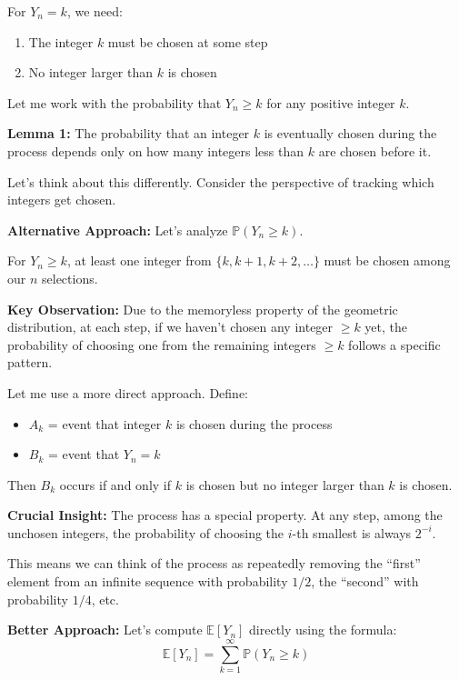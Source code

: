 \documentclass[12pt,a4paper]{article}
\theoremstyle{definition}
\begin{document}
    For $Y_n = k$, we need:
    \begin{enumerate}
        \item The integer $k$ must be chosen at some step
        \item No integer larger than $k$ is chosen
    \end{enumerate}

    Let me work with the probability that $Y_n \geq k$ for any positive integer $k$.

    \textbf{Lemma 1:} The probability that an integer $k$ is eventually chosen during the process depends only on how many integers less than $k$ are chosen before it.

    Let's think about this differently. Consider the perspective of tracking which integers get chosen.

    \textbf{Alternative Approach:} Let's analyze $\mathbb{P}(Y_n \geq k)$.

    For $Y_n \geq k$, at least one integer from $\{k, k+1, k+2, \ldots\}$ must be chosen among our $n$ selections.

    \textbf{Key Observation:} Due to the memoryless property of the geometric distribution, at each step, if we haven't chosen any integer $\geq k$ yet, the probability of choosing one from the remaining integers $\geq k$ follows a specific pattern.

    Let me use a more direct approach. Define:
    \begin{itemize}
        \item $A_k$ = event that integer $k$ is chosen during the process
        \item $B_k$ = event that $Y_n = k$
    \end{itemize}

    Then $B_k$ occurs if and only if $k$ is chosen but no integer larger than $k$ is chosen.

    \textbf{Crucial Insight:} The process has a special property. At any step, among the unchosen integers, the probability of choosing the $i$-th smallest is always $2^{-i}$.

    This means we can think of the process as repeatedly removing the ``first'' element from an infinite sequence with probability $1/2$, the ``second'' with probability $1/4$, etc.

    \textbf{Better Approach:} Let's compute $\mathbb{E}[Y_n]$ directly using the formula:
    $$\mathbb{E}[Y_n] = \sum_{k=1}^{\infty} \mathbb{P}(Y_n \geq k)$$
\end{document}
